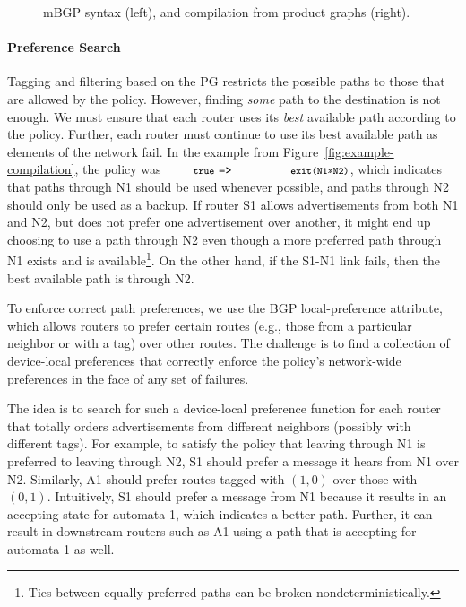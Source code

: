 \documentclass[numbers, 10pt]{sigplanconf}
\newcommand{\para}[1]{\paragraph*{\textbf{#1}}}
\newcommand{\CD}[1]{\texttt{\small #1}}
\newcommand{\KW}[1]{\texttt{\small\bfseries{#1}}}
\newcommand{\True}{\CD{true}}
\newcommand{\Prefer}{\texttt{>>}}
\newcommand{\Path}{\texttt{=>}}
\newcommand{\Exit}{\KW{exit}}
\begin{document}
\begin{figure}[t!]
  \vspace{1em}
  \hrulefill%
  \vspace{-.8em}
  \caption{mBGP syntax (left), and compilation from product graphs (right).}
  \label{fig:concretization}
  \vspace{-.4em}
\end{figure}%


\para{Preference Search}

Tagging and filtering based on the PG restricts the possible paths to those that are allowed by the policy. However, finding \emph{some} path to the destination is not enough. We must ensure that each router uses its \emph{best} available path according to the policy. Further, each router must continue to use its best available path as elements of the network fail. In the example from Figure~\ref{fig:example-compilation}, the policy was $\True ~\Path~ \CD{\Exit(N1\Prefer N2)}$, which indicates that paths through N1 should be used whenever possible, and paths through N2 should only be used as a backup. If router S1 allows advertisements from both N1 and N2, but does not prefer one advertisement over another, it might end up choosing to use a path through N2 even though a more preferred path through N1 exists and is available\footnote{Ties between equally preferred paths can be broken nondeterministically.}. On the other hand, if the S1-N1 link fails, then the best available path is through N2.

To enforce correct path preferences, we use the BGP local-preference attribute, which allows routers to prefer certain routes (e.g., those from a particular neighbor or with a tag) over other routes. The challenge is to find a collection of device-local preferences that correctly enforce the policy's network-wide preferences in the face of any set of failures.

The idea is to search for such a device-local preference function for each router that totally orders advertisements from different neighbors (possibly with different tags). For example, to satisfy the policy that leaving through N1 is preferred to leaving through N2, S1 should prefer a message it hears from N1 over N2. Similarly, A1 should prefer routes tagged with $(1,0)$ over those with $(0,1)$. Intuitively, S1 should prefer a message from N1 because it results in an accepting state for automata 1, which indicates a better path. Further, it can result in downstream routers such as A1 using a path that is accepting for automata 1 as well.
\end{document}
